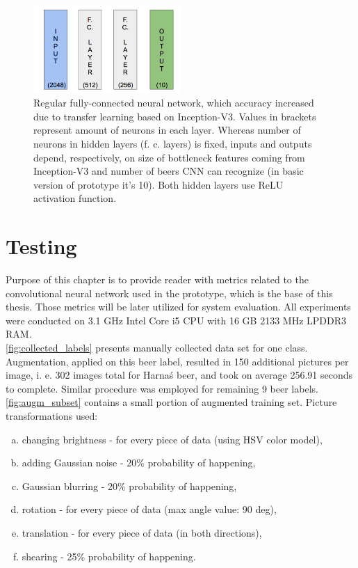 \documentclass[11pt]{article}
\begin{document}
\begin{figure}[h]
\includegraphics[width=0.5\textwidth]{worse_net}
\centering
\caption{Regular fully-connected neural network, which accuracy increased due to transfer learning based on Inception-V3. Values in brackets represent amount of neurons in each layer. Whereas number of neurons in hidden layers (f. c. layers) is fixed, inputs and outputs depend, respectively, on size of bottleneck features coming from Inception-V3 and number of beers CNN can recognize (in basic version of prototype it's 10). Both hidden layers use ReLU activation function.}
\label{fig:worse_net}
\end{figure}
\clearpage

\section{Testing} \label{testing}
Purpose of this chapter is to provide reader with metrics related to the convolutional neural network used in the prototype, which is the base of this thesis. Those metrics will be later utilized for system evaluation. All experiments were conducted on 3.1 GHz Intel Core i5 CPU with 16 GB 2133 MHz LPDDR3 RAM.\\

\autoref{fig:collected_labels} presents manually collected data set for one class. Augmentation, applied on this beer label, resulted in 150 additional pictures per image, i. e. 302 images total for \foreignlanguage{polish}{Harnaś} beer, and took on average 256.91 seconds to complete. Similar procedure was employed for remaining 9 beer labels. \autoref{fig:augm_subset} contains a small portion of augmented training set. Picture transformations used:
\begin{enumerate}[a)]
\item changing brightness - for every piece of data (using HSV color model),
\item adding Gaussian noise - 20\% probability of happening,
\item Gaussian blurring - 20\% probability of happening,
\item rotation - for every piece of data (max angle value: 90 deg),
\item translation - for every piece of data (in both directions),
\item shearing - 25\% probability of happening.
\end{enumerate}
\end{document}
